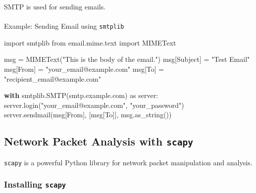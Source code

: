\documentclass[
  letterpaper,
  DIV=11,
  numbers=noendperiod]{scrreprt}
\makeatletter
\let\oldparagraph\paragraph
\renewcommand{\paragraph}{
    \@ifstar
      \xxxParagraphStar
      \xxxParagraphNoStar
  }
\newcommand{\xxxParagraphStar}[1]{\oldparagraph*{#1}\mbox{}}
\newcommand{\xxxParagraphNoStar}[1]{\oldparagraph{#1}\mbox{}}
\newenvironment{Shaded}{\begin{snugshade}}{\end{snugshade}}
\newcommand{\ControlFlowTok}[1]{\textcolor[rgb]{0.00,0.23,0.31}{\textbf{#1}}}
\newcommand{\ImportTok}[1]{\textcolor[rgb]{0.00,0.46,0.62}{#1}}
\newcommand{\NormalTok}[1]{\textcolor[rgb]{0.00,0.23,0.31}{#1}}
\newcommand{\OperatorTok}[1]{\textcolor[rgb]{0.37,0.37,0.37}{#1}}
\newcommand{\StringTok}[1]{\textcolor[rgb]{0.13,0.47,0.30}{#1}}
\makeatother
\begin{document}
SMTP is used for sending emails.

\paragraph{\texorpdfstring{Example: Sending Email using
\texttt{smtplib}}{Example: Sending Email using smtplib}}\label{example-sending-email-using-smtplib}

\begin{Shaded}
\begin{Highlighting}[]
\ImportTok{import}\NormalTok{ smtplib}
\ImportTok{from}\NormalTok{ email.mime.text }\ImportTok{import}\NormalTok{ MIMEText}

\NormalTok{msg }\OperatorTok{=}\NormalTok{ MIMEText(}\StringTok{"This is the body of the email."}\NormalTok{)}
\NormalTok{msg[}\StringTok{\textquotesingle{}Subject\textquotesingle{}}\NormalTok{] }\OperatorTok{=} \StringTok{"Test Email"}
\NormalTok{msg[}\StringTok{\textquotesingle{}From\textquotesingle{}}\NormalTok{] }\OperatorTok{=} \StringTok{"your\_email@example.com"}
\NormalTok{msg[}\StringTok{\textquotesingle{}To\textquotesingle{}}\NormalTok{] }\OperatorTok{=} \StringTok{"recipient\_email@example.com"}

\ControlFlowTok{with}\NormalTok{ smtplib.SMTP(}\StringTok{\textquotesingle{}smtp.example.com\textquotesingle{}}\NormalTok{) }\ImportTok{as}\NormalTok{ server:}
\NormalTok{    server.login(}\StringTok{"your\_email@example.com"}\NormalTok{, }\StringTok{"your\_password"}\NormalTok{)}
\NormalTok{    server.sendmail(msg[}\StringTok{\textquotesingle{}From\textquotesingle{}}\NormalTok{], [msg[}\StringTok{\textquotesingle{}To\textquotesingle{}}\NormalTok{]], msg.as\_string())}
\end{Highlighting}
\end{Shaded}

\subsection{\texorpdfstring{Network Packet Analysis with
\texttt{scapy}}{Network Packet Analysis with scapy}}\label{network-packet-analysis-with-scapy}

\texttt{scapy} is a powerful Python library for network packet
manipulation and analysis.

\subsubsection{\texorpdfstring{Installing
\texttt{scapy}}{Installing scapy}}\label{installing-scapy}
\end{document}
